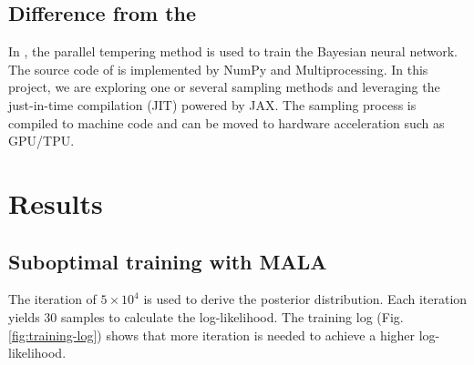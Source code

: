 \documentclass{article}
\begin{document}
\subsection{Difference from the \cite{chandra2021bayesian}}

In \cite{chandra2021bayesian}, the parallel tempering method is used to train the Bayesian neural network. The source code of \cite{chandra2019langevin} is implemented by NumPy and Multiprocessing. In this project, we are exploring one or several sampling methods and leveraging the just-in-time compilation (JIT) powered by JAX\cite{jax2018github}. The sampling process is compiled to machine code and can be moved to hardware acceleration such as GPU/TPU.


\section{Results}

\subsection{Suboptimal training with MALA}

The iteration of $5\times 10^4$ is used to derive the posterior distribution. Each iteration yields $30$ samples to calculate the log-likelihood. The training log (Fig. \ref{fig:training-log}) shows that more iteration is needed to achieve a higher log-likelihood. 
\end{document}
